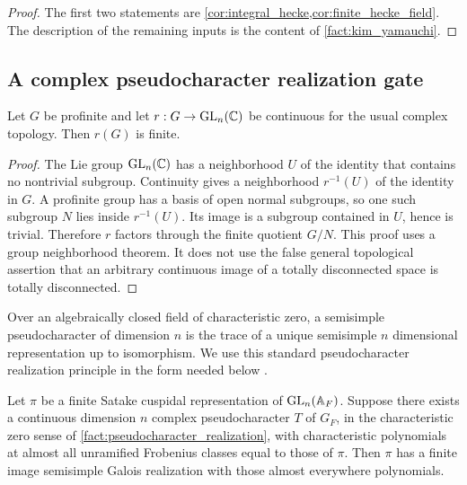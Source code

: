 \begin{proof}
The first two statements are \cref{cor:integral_hecke,cor:finite_hecke_field}. The description of the remaining inputs is the content of \cref{fact:kim_yamauchi}.
\end{proof}

\subsection{A complex pseudocharacter realization gate}

\begin{lemma}\label{lem:complex_profinite_finite}
Let \(G\) be profinite and let \(r:G\to\operatorname{GL}_n(\mathbb C)\) be continuous for the usual complex topology. Then \(r(G)\) is finite.
\end{lemma}

\begin{proof}
The Lie group \(\operatorname{GL}_n(\mathbb C)\) has a neighborhood \(U\) of the identity that contains no nontrivial subgroup. Continuity gives a neighborhood \(r^{-1}(U)\) of the identity in \(G\). A profinite group has a basis of open normal subgroups, so one such subgroup \(N\) lies inside \(r^{-1}(U)\). Its image is a subgroup contained in \(U\), hence is trivial. Therefore \(r\) factors through the finite quotient \(G/N\). This proof uses a group neighborhood theorem. It does not use the false general topological assertion that an arbitrary continuous image of a totally disconnected space is totally disconnected.
\end{proof}

\begin{standardfact}\label{fact:pseudocharacter_realization}
Over an algebraically closed field of characteristic zero, a semisimple pseudocharacter of dimension \(n\) is the trace of a unique semisimple \(n\) dimensional representation up to isomorphism. We use this standard pseudocharacter realization principle in the form needed below \cite{Chenevier2014}.
\end{standardfact}

\begin{theorem}\label{thm:complex_pseudo_gate}
Let \(\pi\) be a finite Satake cuspidal representation of \(\operatorname{GL}_n(\mathbb A_F)\). Suppose there exists a continuous dimension \(n\) complex pseudocharacter \(T\) of \(G_F\), in the characteristic zero sense of \cref{fact:pseudocharacter_realization}, with characteristic polynomials at almost all unramified Frobenius classes equal to those of \(\pi\). Then \(\pi\) has a finite image semisimple Galois realization with those almost everywhere polynomials.
\end{theorem}

